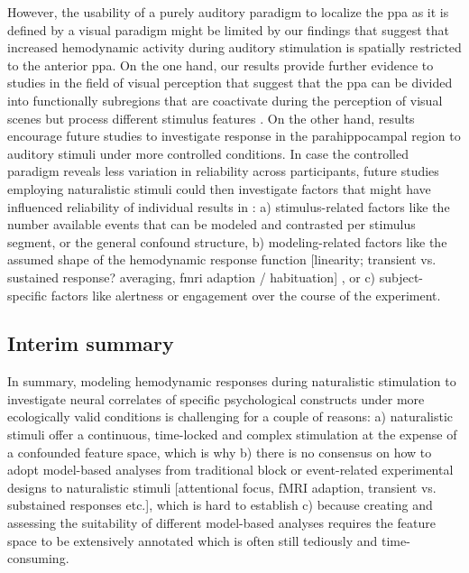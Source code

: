%
However, the usability of a purely auditory paradigm to localize the \ac{ppa} as
it is defined by a visual paradigm might be limited by our findings that suggest
that increased hemodynamic activity during auditory stimulation is spatially
restricted to the anterior \ac{ppa}.
%
On the one hand, our results provide further evidence to studies in the field of
visual perception that suggest that the \ac{ppa} can be divided into
functionally subregions that are coactivate during the perception of visual
scenes but process different stimulus features
\citep{aminoff2007parahippocampal, baldassano2013differential}.
%
On the other hand, results encourage future studies to investigate response in
the parahippocampal region to auditory stimuli under more controlled conditions.
%
In case the controlled paradigm reveals less variation in reliability across
participants, future studies employing naturalistic stimuli could then
investigate factors that might have influenced reliability of individual results
in \citet{haeusler2022processing}:
%
a) stimulus-related factors like the number available events that can be modeled
and contrasted per stimulus segment, or the general confound structure,
%
b) modeling-related factors like the assumed shape of the hemodynamic response
function [linearity; transient vs. sustained response? averaging, fmri adaption
/ habituation] , or
%
c) subject-specific factors like alertness or engagement over the course of the
experiment.


\pagebreak


\subsection{Interim summary}


%
In summary, modeling hemodynamic responses during naturalistic stimulation to
investigate neural correlates of specific psychological constructs under more
ecologically valid conditions is challenging for a couple of reasons:
%
a) naturalistic stimuli offer a continuous, time-locked and complex stimulation
at the expense of a confounded feature space, which is why
%
b) there is no consensus on how to adopt model-based analyses from traditional
block or event-related experimental designs to naturalistic stimuli [attentional
focus, fMRI adaption, transient vs. substained responses etc.], which is hard to
establish
%
c) because creating and assessing the suitability of different model-based
analyses requires the feature space to be extensively annotated which is often
still tediously and time-consuming.



